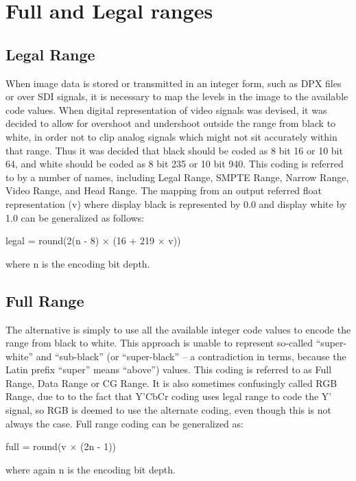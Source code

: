 \section{Full and Legal ranges}
\label{sec:full-and-legal-ranges}

\subsection{Legal Range}
\label{subsec:legal-range}

When image data is stored or transmitted in an integer form, such as DPX files or over SDI signals, it is necessary to map the levels in the image to the available code values. When digital representation of video signals was devised, it was decided to allow for overshoot and undershoot outside the range from black to white, in order not to clip analog signals which might not sit accurately within that range. Thus it was decided that black should be coded as 8 bit 16 or 10 bit 64, and white should be coded as 8 bit 235 or 10 bit 940. This coding is referred to by a number of names, including Legal Range, SMPTE Range, Narrow Range, Video Range, and Head Range. The mapping from an output referred float representation (v) where display black is represented by 0.0 and display white by 1.0 can be generalized as follows:

	legal = round(2(n - 8) × (16 + 219 × v))

where n is the encoding bit depth.

\subsection{Full Range}
\label{subsec:full-range}

The alternative is simply to use all the available integer code values to encode the range from black to white. This approach is unable to represent so-called “super-white” and “sub-black” (or “super-black” – a contradiction in terms, because the Latin prefix “super” means “above”) values. This coding is referred to as Full Range, Data Range or CG Range. It is also sometimes confusingly called RGB Range, due to to the fact that Y'CbCr coding uses legal range to code the Y' signal, so RGB is deemed to use the alternate coding, even though this is not always the case. Full range coding can be generalized as:

	full = round(v × (2n - 1))

where again n is the encoding bit depth.

